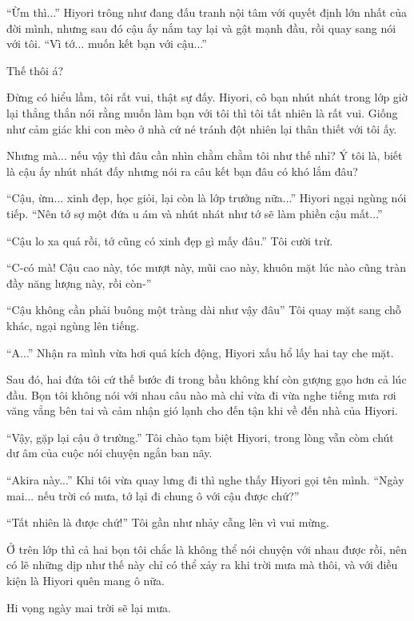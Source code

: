 {``Ừm thì...'' Hiyori trông như đang đấu tranh nội tâm với quyết định lớn
nhất của đời mình, nhưng sau đó cậu ấy nắm tay lại và gật mạnh đầu, rồi
quay sang nói với tôi. ``Vì tớ... muốn kết bạn với cậu...''

Thế thôi á?

Đừng có hiểu lầm, tôi rất vui, thật sự đấy. Hiyori, cô bạn nhút nhát
trong lớp giờ lại thẳng thắn nói rằng muốn làm bạn với tôi thì tôi tất
nhiên là rất vui. Giống như cảm giác khi con mèo ở nhà cứ né tránh đột
nhiên lại thân thiết với tôi ấy.

Nhưng mà... nếu vậy thì đâu cần nhìn chằm chằm tôi như thế nhỉ? Ý tôi
là, biết là cậu ấy nhút nhát đấy nhưng nói ra câu kết bạn đâu có khó lắm
đâu?

``Cậu, ừm... xinh đẹp, học giỏi, lại còn là lớp trưởng nữa...'' Hiyori
ngại ngùng nói tiếp. ``Nên tớ sợ một đứa u ám và nhút nhát như tớ sẽ làm
phiền cậu mất...''

``Cậu lo xa quá rồi, tớ cũng có xinh đẹp gì mấy đâu.'' Tôi cười trừ.

``C-có mà! Cậu cao này, tóc mượt này, mũi cao này, khuôn mặt lúc nào
cũng tràn đầy năng lượng này, rồi còn-''

``Cậu không cần phải buông một tràng dài như vậy đâu'' Tôi quay mặt sang
chỗ khác, ngại ngùng lên tiếng.

``A...'' Nhận ra mình vừa hơi quá kích động, Hiyori xấu hổ lấy hai tay
che mặt.

Sau đó, hai đứa tôi cứ thế bước đi trong bầu không khí còn gượng gạo hơn
cả lúc đầu. Bọn tôi không nói với nhau câu nào mà chỉ vừa đi vừa nghe
tiếng mưa rơi văng vẳng bên tai và cảm nhận gió lạnh cho đến tận khi về
đến nhà của Hiyori.

``Vậy, gặp lại cậu ở trường.'' Tôi chào tạm biệt Hiyori, trong lòng vẫn
còm chút dư âm của cuộc nói chuyện ngắn ban nãy.

``Akira này...'' Khi tôi vừa quay lưng đi thì nghe thấy Hiyori gọi tên
mình. ``Ngày mai... nếu trời có mưa, tớ lại đi chung ô với cậu được
chứ?''

``Tất nhiên là được chứ!'' Tôi gần như nhảy cẫng lên vì vui mừng.

Ở trên lớp thì cả hai bọn tôi chắc là không thể nói chuyện với nhau được
rồi, nên có lẽ những dịp như thế này chỉ có thể xảy ra khi trời mưa mà
thôi, và với điều kiện là Hiyori quên mang ô nữa.

Hi vọng ngày mai trời sẽ lại mưa.

}
